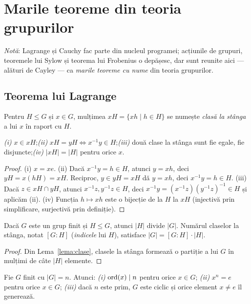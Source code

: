 \section{Marile teoreme din teoria grupurilor}\label{sec:mari}

\emph{Notă}: Lagrange și Cauchy fac parte din nucleul programei; acțiunile de grupuri, teoremele lui Sylow și teorema lui Frobenius o depășesc, dar sunt reunite aici --- alături de Cayley --- ca \emph{marile teoreme cu nume} din teoria grupurilor.

\subsection*{Teorema lui Lagrange}

\begin{definitie}
Pentru $H\le G$ și $x\in G$, mulțimea $xH=\{xh\mid h\in H\}$ se numește \emph{clasă la stânga} a lui $x$ în raport cu $H$.
\end{definitie}

\begin{lema}\label{lema:clase}
\emph{(i)} $x\in xH$;\quad \emph{(ii)} $xH=yH\iff x^{-1}y\in H$;\quad \emph{(iii)} două clase la stânga sunt fie egale, fie disjuncte;\quad \emph{(iv)} $|xH|=|H|$ pentru orice $x$.
\end{lema}

\begin{proof}
(i) $x=xe$. (ii) Dacă $x^{-1}y=h\in H$, atunci $y=xh$, deci $yH=x(hH)=xH$. Reciproc, $y\in yH=xH$ dă $y=xh$, deci $x^{-1}y=h\in H$. (iii) Dacă $z\in xH\cap yH$, atunci $x^{-1}z,y^{-1}z\in H$, deci $x^{-1}y=(x^{-1}z)(y^{-1}z)^{-1}\in H$ și aplicăm (ii). (iv) Funcția $h\mapsto xh$ este o bijecție de la $H$ la $xH$ (injectivă prin simplificare, surjectivă prin definiție).
\end{proof}

\begin{teorema}[Lagrange]\label{teo:lagrange}
Dacă $G$ este un grup finit și $H\le G$, atunci $|H|$ divide $|G|$. Numărul claselor la stânga, notat $[G:H]$ (\emph{indicele} lui $H$), satisface $|G|=[G:H]\cdot|H|$.
\end{teorema}

\begin{proof}
Din Lema~\ref{lema:clase}, clasele la stânga formează o partiție a lui $G$ în mulțimi de câte $|H|$ elemente.
\end{proof}

\begin{corolar}\label{cor:lagrange}
Fie $G$ finit cu $|G|=n$. Atunci: \emph{(i)} $\operatorname{ord}(x)\mid n$ pentru orice $x\in G$; \emph{(ii)} $x^{n}=e$ pentru orice $x\in G$; \emph{(iii)} dacă $n$ este prim, $G$ este ciclic și orice element $x\neq e$ îl generează.
\end{corolar}

